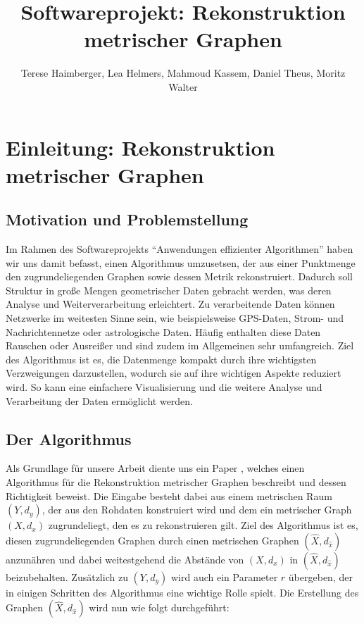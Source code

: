 \documentclass[parskip=half,
 fontsize=12pt, bibtotoc,
 ngerman]
 {article}
\author{Terese Haimberger, Lea Helmers, Mahmoud Kassem, Daniel Theus, Moritz Walter}
\title{Softwareprojekt: Rekonstruktion metrischer Graphen}
\date{}
\begin{document}
\maketitle
\tableofcontents
\newpage
\onehalfspacing
\section{Einleitung: Rekonstruktion metrischer Graphen}
\subsection*{Motivation und Problemstellung}
Im Rahmen des Softwareprojekts "`Anwendungen effizienter Algorithmen"' haben wir uns damit befasst, einen Algorithmus umzusetsen, der aus einer Punktmenge den zugrundeliegenden Graphen sowie dessen Metrik rekonstruiert. Dadurch soll Struktur in gro{\ss}e Mengen geometrischer Daten gebracht werden, was deren Analyse und Weiterverarbeitung erleichtert. Zu verarbeitende Daten können Netzwerke im weitesten Sinne sein, wie beispielsweise GPS-Daten, Strom- und Nachrichtennetze oder astrologische Daten. Häufig enthalten diese Daten Rauschen oder Ausreißer und sind zudem im Allgemeinen sehr umfangreich. Ziel des Algorithmus ist es, die Datenmenge kompakt durch ihre wichtigsten Verzweigungen darzustellen, wodurch sie auf ihre wichtigen Aspekte reduziert wird. So kann eine einfachere Visualisierung und die weitere Analyse und Verarbeitung der Daten ermöglicht werden.
\subsection*{Der Algorithmus}
Als Grundlage für unsere Arbeit diente uns ein Paper \cite{chenEa2012}, welches einen Algorithmus für die Rekonstruktion metrischer Graphen beschreibt und dessen Richtigkeit beweist. Die Eingabe besteht dabei aus einem metrischen Raum $\left(Y, d_y\right)$, der aus den Rohdaten konstruiert wird und dem ein metrischer Graph $\left(X, d_x\right)$ zugrundeliegt, den es zu rekonstruieren gilt. Ziel des Algorithmus ist es, diesen zugrundeliegenden Graphen durch einen metrischen Graphen $(\hat{X}, d_{\hat{x}})$ anzunähren und dabei weitestgehend die Abstände von $\left(X, d_x\right)$ in $(\hat{X}, d_{\hat{x}})$ beizubehalten. Zusätzlich zu $\left(Y, d_y\right)$ wird auch ein Parameter $r$ übergeben, der in einigen Schritten des Algorithmus eine wichtige Rolle spielt. Die Erstellung des Graphen $(\hat{X}, d_{\hat{x}})$ wird nun wie folgt durchgeführt:\newline
\end{document}
